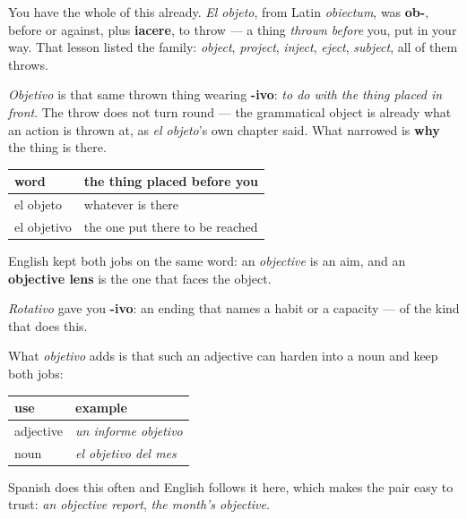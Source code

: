 \begin{cousinweb}
You have the whole of this already. \emph{El objeto}, from Latin \emph{obiectum}, was \textbf{ob-}, before or against, plus \textbf{iacere}, to throw — a thing \emph{thrown before} you, put in your way. That lesson listed the family: \emph{object}, \emph{project}, \emph{inject}, \emph{eject}, \emph{subject}, all of them throws.

\emph{Objetivo} is that same thrown thing wearing \textbf{-ivo}: \emph{to do with the thing placed in front}. The throw does not turn round — the grammatical object is already what an action is thrown at, as \emph{el objeto}'s own chapter said. What narrowed is \textbf{why} the thing is there.

\noindent
\begin{tabularx}{\linewidth}{@{}>{\raggedright\arraybackslash}X>{\raggedright\arraybackslash}X@{}}
\toprule
\textbf{word} & \textbf{the thing placed before you} \\
\midrule
el objeto & whatever is there \\
el objetivo & the one put there to be reached \\
\bottomrule
\end{tabularx}

English kept both jobs on the same word: an \emph{objective} is an aim, and an \textbf{objective lens} is the one that faces the object.
\end{cousinweb}

\begin{grammarlens}[title={Grammar Lens: -ivo makes an adjective that can stand alone}]
\emph{Rotativo} gave you \textbf{-ivo}: an ending that names a habit or a capacity — of the kind that does this.

What \emph{objetivo} adds is that such an adjective can harden into a noun and keep both jobs:

\noindent
\begin{tabularx}{\linewidth}{@{}>{\raggedright\arraybackslash}X>{\raggedright\arraybackslash}X@{}}
\toprule
\textbf{use} & \textbf{example} \\
\midrule
adjective & \emph{un informe objetivo} \\
noun & \emph{el objetivo del mes} \\
\bottomrule
\end{tabularx}

Spanish does this often and English follows it here, which makes the pair easy to trust: \emph{an objective report}, \emph{the month's objective}.
\end{grammarlens}

